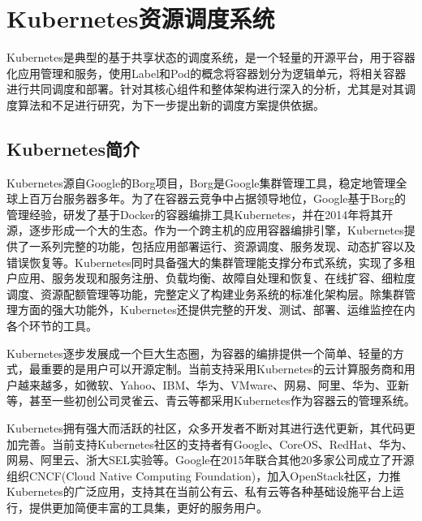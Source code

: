 \section{Kubernetes资源调度系统}
\label{sec:bib}
Kubernetes是典型的基于共享状态的调度系统，是一个轻量的开源平台，用于容器化应用管理和服务，使用Label和Pod的概念将容器划分为逻辑单元，将相关容器进行共同调度和部署。针对其核心组件和整体架构进行深入的分析，尤其是对其调度算法和不足进行研究，为下一步提出新的调度方案提供依据。
\subsection{Kubernetes简介}
Kubernetes源自Google的Borg项目，Borg是Google集群管理工具，稳定地管理全球上百万台服务器多年。为了在容器云竞争中占据领导地位，Google基于Borg的管理经验，研发了基于Docker的容器编排工具Kubernetes，并在2014年将其开源，逐步形成一个大的生态。作为一个跨主机的应用容器编排引擎，Kubernetes提供了一系列完整的功能，包括应用部署运行、资源调度、服务发现、动态扩容以及错误恢复等。Kubernetes同时具备强大的集群管理能支撑分布式系统，实现了多租户应用、服务发现和服务注册、负载均衡、故障自处理和恢复、在线扩容、细粒度调度、资源配额管理等功能，完整定义了构建业务系统的标准化架构层。除集群管理方面的强大功能外，Kubernetes还提供完整的开发、测试、部署、运维监控在内各个环节的工具。

Kubernetes逐步发展成一个巨大生态圈，为容器的编排提供一个简单、轻量的方式，最重要的是用户可以开源定制。当前支持采用Kubernetes的云计算服务商和用户越来越多，如微软、Yahoo、IBM、华为、VMware、网易、阿里、华为、亚新等，甚至一些初创公司灵雀云、青云等都采用Kubernetes作为容器云的管理系统。

Kubernetes拥有强大而活跃的社区，众多开发者不断对其进行迭代更新，其代码更加完善。当前支持Kubernetes社区的支持者有Google、CoreOS、RedHat、华为、网易、阿里云、浙大SEL实验等。Google在2015年联合其他20多家公司成立了开源组织CNCF(Cloud Native Computing Foundation)，加入OpenStack社区，力推Kubernetes的广泛应用，支持其在当前公有云、私有云等各种基础设施平台上运行，提供更加简便丰富的工具集，更好的服务用户。

